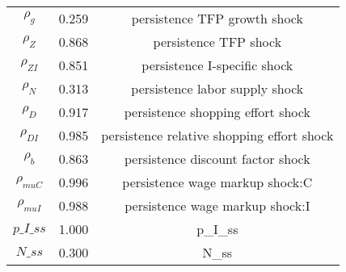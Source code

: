 \begin{center}
\begin{longtable}{ccc}
${\rho_g}$ 	 & 	 0.259 	 & 	 persistence TFP growth shock\\
${\rho_Z}$ 	 & 	 0.868 	 & 	 persistence TFP shock\\
${\rho_{ZI}}$ 	 & 	 0.851 	 & 	 persistence I-specific shock\\
${\rho_N}$ 	 & 	 0.313 	 & 	 persistence labor supply shock\\
${\rho_D}$ 	 & 	 0.917 	 & 	 persistence shopping effort shock\\
${\rho_{DI}}$ 	 & 	 0.985 	 & 	 persistence relative shopping effort shock\\
${\rho_b}$ 	 & 	 0.863 	 & 	 persistence discount factor shock\\
${\rho_{muC}}$ 	 & 	 0.996 	 & 	 persistence wage markup shock:C\\
${\rho_{muI}}$ 	 & 	 0.988 	 & 	 persistence wage markup shock:I\\
$p\_I\_ss$ 	 & 	 1.000 	 & 	 p\_I\_ss\\
$N\_ss$ 	 & 	 0.300 	 & 	 N\_ss\\
\bottomrule%
\end{longtable}
\end{center}
